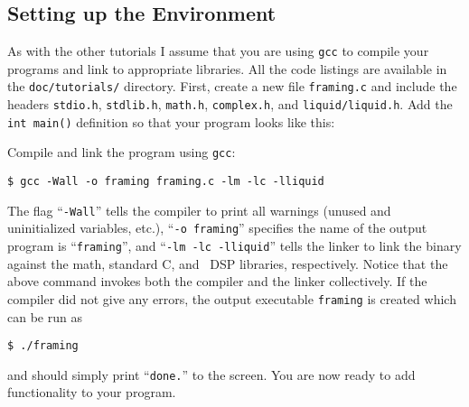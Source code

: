 %
%
\subsection{Setting up the Environment}
\label{tutorial:framing:environment}

As with the other tutorials I assume that you are using {\tt gcc} to
compile your programs and link to appropriate libraries.
All the code listings are available in the {\tt doc/tutorials/}
directory.
First, create a new file {\tt framing.c} and include the headers
{\tt stdio.h},
{\tt stdlib.h},
{\tt math.h},
{\tt complex.h}, and
{\tt liquid/liquid.h}.
Add the {\tt int main()} definition so that your program looks like
this:
%

%
Compile and link the program using {\tt gcc}:
%
\begin{Verbatim}[fontsize=\small]
    $ gcc -Wall -o framing framing.c -lm -lc -lliquid
\end{Verbatim}
%
The flag ``{\tt -Wall}'' tells the compiler to print all warnings
(unused and uninitialized variables, etc.),
``{\tt -o framing}'' specifies the name of the output program is
``{\tt framing}'', and
``{\tt -lm -lc -lliquid}'' tells the linker to link the binary against
the math, standard C, and \liquid\ DSP libraries, respectively.
Notice that the above command invokes both the compiler and the linker
collectively.
%
If the compiler did not give any errors, the output executable
{\tt framing} is created which can be run as
%
\begin{Verbatim}[fontsize=\small]
    $ ./framing
\end{Verbatim}
%
and should simply print ``{\tt done.}'' to the screen.
You are now ready to add functionality to your program.



%
%
